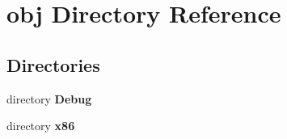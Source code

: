 \section{obj Directory Reference}
\label{dir_227ae7b0c74470f0ca469b12ab5f251d}
\subsection*{Directories}
\begin{DoxyCompactItemize}
\item 
directory {\bf Debug}
\item 
directory {\bf x86}
\end{DoxyCompactItemize}
